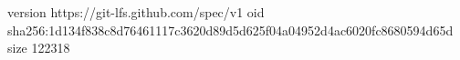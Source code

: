 version https://git-lfs.github.com/spec/v1
oid sha256:1d134f838c8d76461117c3620d89d5d625f04a04952d4ac6020fc8680594d65d
size 122318
